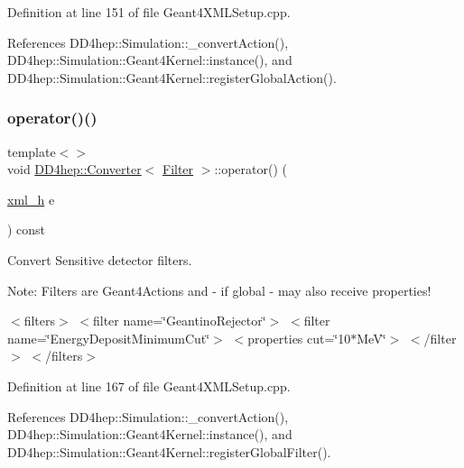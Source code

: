 Definition at line 151 of file Geant4\+X\+M\+L\+Setup.\+cpp.



References D\+D4hep\+::\+Simulation\+::\+\_\+convert\+Action(), D\+D4hep\+::\+Simulation\+::\+Geant4\+Kernel\+::instance(), and D\+D4hep\+::\+Simulation\+::\+Geant4\+Kernel\+::register\+Global\+Action().

\hypertarget{struct_d_d4hep_1_1_converter_ab8a56e6d9fcd3e1ba553e878607dfe75}{}\label{struct_d_d4hep_1_1_converter_ab8a56e6d9fcd3e1ba553e878607dfe75} 
\subsubsection{\texorpdfstring{operator()()}{operator()()}\hspace{0.1cm}{\footnotesize\ttfamily [13/22]}}
{\footnotesize\ttfamily template$<$$>$ \\
void \hyperlink{struct_d_d4hep_1_1_converter}{D\+D4hep\+::\+Converter}$<$ \hyperlink{namespace_d_d4hep_1_1_simulation_1_1_setup_ad8d99728c073de63615427fbb8a1992a}{Filter} $>$\+::operator() (\begin{DoxyParamCaption}\item[{\hyperlink{_det_factory_helper_8h_ac13b3c79d2bc9214ff0cf5b8dc43dda6}{xml\+\_\+h}}]{e }\end{DoxyParamCaption}) const}



Convert Sensitive detector filters. 

Note\+: Filters are Geant4\+Actions and -\/ if global -\/ may also receive properties!

$<$filters$>$ $<$filter name=\char`\"{}\+Geantino\+Rejector\char`\"{}$>$ $<$filter name=\char`\"{}\+Energy\+Deposit\+Minimum\+Cut\char`\"{}$>$ $<$properties cut=\char`\"{}10$\ast$\+Me\+V\char`\"{}$>$ $<$/filter$>$ $<$/filters$>$ 

Definition at line 167 of file Geant4\+X\+M\+L\+Setup.\+cpp.



References D\+D4hep\+::\+Simulation\+::\+\_\+convert\+Action(), D\+D4hep\+::\+Simulation\+::\+Geant4\+Kernel\+::instance(), and D\+D4hep\+::\+Simulation\+::\+Geant4\+Kernel\+::register\+Global\+Filter().

\hypertarget{struct_d_d4hep_1_1_converter_a018529354431939b9321faeae3ffeabc}{}\label{struct_d_d4hep_1_1_converter_a018529354431939b9321faeae3ffeabc} 
